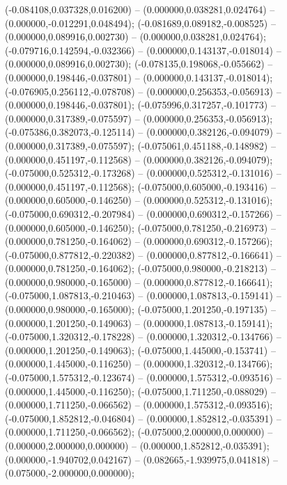  (-0.084108,0.037328,0.016200) -- (0.000000,0.038281,0.024764) -- (0.000000,-0.012291,0.048494);
 (-0.081689,0.089182,-0.008525) -- (0.000000,0.089916,0.002730) -- (0.000000,0.038281,0.024764);
 (-0.079716,0.142594,-0.032366) -- (0.000000,0.143137,-0.018014) -- (0.000000,0.089916,0.002730);
 (-0.078135,0.198068,-0.055662) -- (0.000000,0.198446,-0.037801) -- (0.000000,0.143137,-0.018014);
 (-0.076905,0.256112,-0.078708) -- (0.000000,0.256353,-0.056913) -- (0.000000,0.198446,-0.037801);
 (-0.075996,0.317257,-0.101773) -- (0.000000,0.317389,-0.075597) -- (0.000000,0.256353,-0.056913);
 (-0.075386,0.382073,-0.125114) -- (0.000000,0.382126,-0.094079) -- (0.000000,0.317389,-0.075597);
 (-0.075061,0.451188,-0.148982) -- (0.000000,0.451197,-0.112568) -- (0.000000,0.382126,-0.094079);
 (-0.075000,0.525312,-0.173268) -- (0.000000,0.525312,-0.131016) -- (0.000000,0.451197,-0.112568);
 (-0.075000,0.605000,-0.193416) -- (0.000000,0.605000,-0.146250) -- (0.000000,0.525312,-0.131016);
 (-0.075000,0.690312,-0.207984) -- (0.000000,0.690312,-0.157266) -- (0.000000,0.605000,-0.146250);
 (-0.075000,0.781250,-0.216973) -- (0.000000,0.781250,-0.164062) -- (0.000000,0.690312,-0.157266);
 (-0.075000,0.877812,-0.220382) -- (0.000000,0.877812,-0.166641) -- (0.000000,0.781250,-0.164062);
 (-0.075000,0.980000,-0.218213) -- (0.000000,0.980000,-0.165000) -- (0.000000,0.877812,-0.166641);
 (-0.075000,1.087813,-0.210463) -- (0.000000,1.087813,-0.159141) -- (0.000000,0.980000,-0.165000);
 (-0.075000,1.201250,-0.197135) -- (0.000000,1.201250,-0.149063) -- (0.000000,1.087813,-0.159141);
 (-0.075000,1.320312,-0.178228) -- (0.000000,1.320312,-0.134766) -- (0.000000,1.201250,-0.149063);
 (-0.075000,1.445000,-0.153741) -- (0.000000,1.445000,-0.116250) -- (0.000000,1.320312,-0.134766);
 (-0.075000,1.575312,-0.123674) -- (0.000000,1.575312,-0.093516) -- (0.000000,1.445000,-0.116250);
 (-0.075000,1.711250,-0.088029) -- (0.000000,1.711250,-0.066562) -- (0.000000,1.575312,-0.093516);
 (-0.075000,1.852812,-0.046804) -- (0.000000,1.852812,-0.035391) -- (0.000000,1.711250,-0.066562);
 (-0.075000,2.000000,0.000000) -- (0.000000,2.000000,0.000000) -- (0.000000,1.852812,-0.035391);
 (0.000000,-1.940702,0.042167) -- (0.082665,-1.939975,0.041818) -- (0.075000,-2.000000,0.000000);
